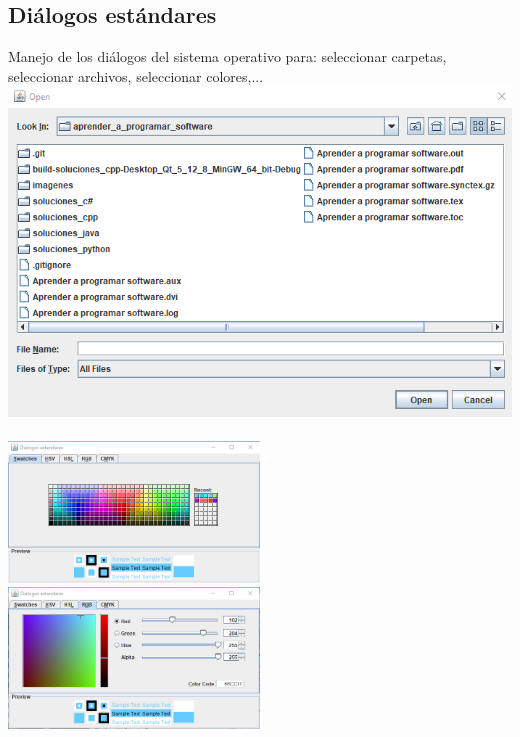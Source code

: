 \documentclass[spanish,12pt,a4paper,final,oneside]{book}
\begin{document}
\subsection{Diálogos estándares}\label{ejercicio_dialogos}
Manejo de los diálogos del sistema operativo para: seleccionar carpetas, seleccionar archivos, seleccionar colores,...
\\\includegraphics[width=\textwidth]{Dialogos Estandares - JFileChooser - Java}
\\\\
\includegraphics[width=0.5\textwidth]{Dialogos Estandares - JColorChooser - Swatches - Java}
\includegraphics[width=0.5\textwidth]{Dialogos Estandares - JColorChooser - RGB - Java}
\end{document}

